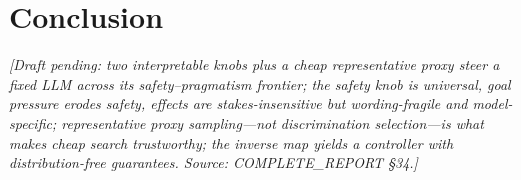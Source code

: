 \chapter{Conclusion}
\label{ch:conclusion}
\emph{[Draft pending: two interpretable knobs plus a cheap representative proxy steer a fixed
LLM across its safety--pragmatism frontier; the safety knob is universal, goal pressure erodes
safety, effects are stakes-insensitive but wording-fragile and model-specific; representative
proxy sampling---not discrimination selection---is what makes cheap search trustworthy; the
inverse map yields a controller with distribution-free guarantees. Source: COMPLETE\_REPORT \S34.]}
